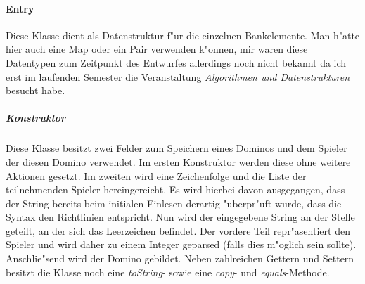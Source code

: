 \paragraph{Entry}
\label{par:entry}
Diese Klasse dient als Datenstruktur f"ur die einzelnen Bankelemente. Man h"atte hier auch eine Map oder ein Pair verwenden k"onnen, mir waren diese Datentypen zum Zeitpunkt des Entwurfes allerdings noch nicht bekannt da ich erst im laufenden Semester die Veranstaltung \emph{Algorithmen und Datenstrukturen} besucht habe. 

\subparagraph{Konstruktor}
Diese Klasse besitzt zwei Felder zum Speichern eines Dominos und dem Spieler der diesen Domino verwendet. Im ersten Konstruktor werden diese ohne weitere Aktionen gesetzt. Im zweiten wird eine Zeichenfolge und die Liste der teilnehmenden Spieler hereingereicht. Es wird hierbei davon ausgegangen, dass der String bereits beim initialen Einlesen derartig "uberpr"uft wurde, dass die Syntax den Richtlinien entspricht. Nun wird der eingegebene String an der Stelle geteilt, an der sich das Leerzeichen befindet. Der vordere Teil repr"asentiert den Spieler und wird daher zu einem Integer geparsed (falls dies m"oglich sein sollte). Anschlie"send wird der Domino gebildet. Neben zahlreichen Gettern und Settern besitzt die Klasse noch eine \emph{toString}- sowie eine \emph{copy}- und \emph{equals}-Methode. 
